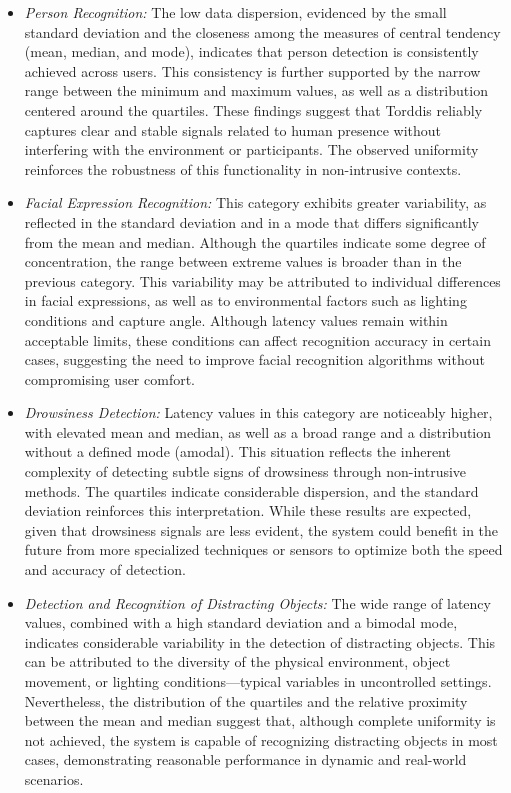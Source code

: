                 \begin{itemize}
                    \item \textit{Person Recognition:} The low data dispersion, evidenced by the small standard deviation and the closeness among the measures of central tendency (mean, median, and mode), indicates that person detection is consistently achieved across users. This consistency is further supported by the narrow range between the minimum and maximum values, as well as a distribution centered around the quartiles. These findings suggest that Torddis reliably captures clear and stable signals related to human presence without interfering with the environment or participants. The observed uniformity reinforces the robustness of this functionality in non-intrusive contexts.
                    
                    \item \textit{Facial Expression Recognition:} This category exhibits greater variability, as reflected in the standard deviation and in a mode that differs significantly from the mean and median. Although the quartiles indicate some degree of concentration, the range between extreme values is broader than in the previous category. This variability may be attributed to individual differences in facial expressions, as well as to environmental factors such as lighting conditions and capture angle. Although latency values remain within acceptable limits, these conditions can affect recognition accuracy in certain cases, suggesting the need to improve facial recognition algorithms without compromising user comfort.
                    
                    \item \textit{Drowsiness Detection:} Latency values in this category are noticeably higher, with elevated mean and median, as well as a broad range and a distribution without a defined mode (amodal). This situation reflects the inherent complexity of detecting subtle signs of drowsiness through non-intrusive methods. The quartiles indicate considerable dispersion, and the standard deviation reinforces this interpretation. While these results are expected, given that drowsiness signals are less evident, the system could benefit in the future from more specialized techniques or sensors to optimize both the speed and accuracy of detection.
                    
                    \item \textit{Detection and Recognition of Distracting Objects:} The wide range of latency values, combined with a high standard deviation and a bimodal mode, indicates considerable variability in the detection of distracting objects. This can be attributed to the diversity of the physical environment, object movement, or lighting conditions—typical variables in uncontrolled settings. Nevertheless, the distribution of the quartiles and the relative proximity between the mean and median suggest that, although complete uniformity is not achieved, the system is capable of recognizing distracting objects in most cases, demonstrating reasonable performance in dynamic and real-world scenarios.
                \end{itemize}
                
